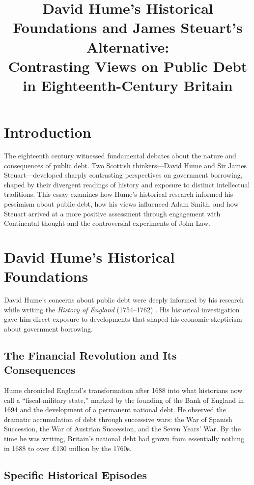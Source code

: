 \documentclass[12pt]{article}
\title{David Hume's Historical Foundations and James Steuart's Alternative:\\Contrasting Views on Public Debt in Eighteenth-Century Britain}
\author{}
\date{}
\begin{document}
\maketitle


\section{Introduction}

The eighteenth century witnessed fundamental debates about the nature and consequences of public debt. Two Scottish thinkers---David Hume and Sir James Steuart---developed sharply contrasting perspectives on government borrowing, shaped by their divergent readings of history and exposure to distinct intellectual traditions. This essay examines how Hume's historical research informed his pessimism about public debt, how his views influenced Adam Smith, and how Steuart arrived at a more positive assessment through engagement with Continental thought and the controversial experiments of John Law.

\section{David Hume's Historical Foundations}

David Hume's concerns about public debt were deeply informed by his research while writing the \textit{History of England} (1754--1762) \citep{hume1754history}. His historical investigation gave him direct exposure to developments that shaped his economic skepticism about government borrowing.

\subsection{The Financial Revolution and Its Consequences}

Hume chronicled England's transformation after 1688 into what historians now call a ``fiscal-military state,'' marked by the founding of the Bank of England in 1694 and the development of a permanent national debt. He observed the dramatic accumulation of debt through successive wars: the War of Spanish Succession, the War of Austrian Succession, and the Seven Years' War. By the time he was writing, Britain's national debt had grown from essentially nothing in 1688 to over £130 million by the 1760s.

\subsection{Specific Historical Episodes}
\end{document}
